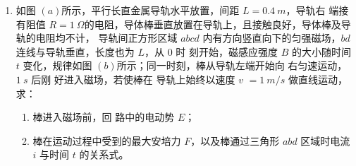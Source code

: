 \begin{enumerate}
\item
{}
如图 $ (a) $所示，平行长直金属导轨水平放置，间距 $ L=0.4 \ m $，导轨右
端接有阻值 $ R=1 \ \Omega $的电阻，导体棒垂直放置在导轨上，且接触良好，导体棒及导轨的电阻均不计，
导轨间正方形区域 $ abcd $ 内有方向竖直向下的匀强磁场，$ bd $ 连线与导轨垂直，长度也为 $ L $，从 $ 0 $ 时
刻开始，磁感应强度 $ B $ 的大小随时间 $ t $ 变化，规律如图 $ (b) $所示；同一时刻，棒从导轨左端开始向
右匀速运动，$ 1 \ s $ 后刚
好进入磁场，若使棒在
导轨上始终以速度 $ v $
$ =1 \ m /s $ 做直线运动，
求：
\begin{enumerate}
\item
棒进入磁场前，回
路中的电动势 $ E $；




\item 
棒在运动过程中受到的最大安培力 $ F $，以及棒通过三角形 $ abd $ 区域时电流 $ i $ 与时间 $ t $ 的关系式。


\end{enumerate}
\begin{figure}[h!]
\centering
\begin{subfigure}{0.4\linewidth}
\centering
 
\caption{}\label{}
\end{subfigure}
\begin{subfigure}{0.4\linewidth}
\centering
 
\caption{}\label{}
\end{subfigure}
\end{figure}








\end{enumerate}

